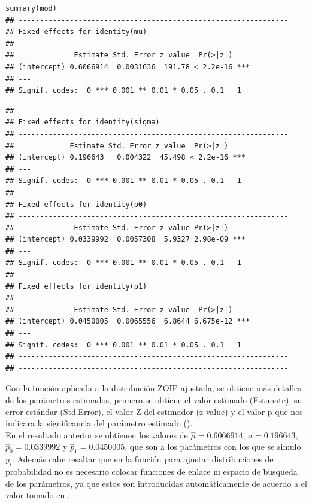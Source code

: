 \begin{verbatim}
summary(mod)
## ---------------------------------------------------------------
## Fixed effects for identity(mu)
## ---------------------------------------------------------------
##              Estimate Std. Error z value  Pr(>|z|)    
## (intercept) 0.6066914  0.0031636  191.78 < 2.2e-16 ***
## ---
## Signif. codes:  0 *** 0.001 ** 0.01 * 0.05 . 0.1   1
\end{verbatim}
\begin{verbatim}
## ---------------------------------------------------------------
## Fixed effects for identity(sigma)
## ---------------------------------------------------------------
##             Estimate Std. Error z value  Pr(>|z|)    
## (intercept) 0.196643   0.004322  45.498 < 2.2e-16 ***
## ---
## Signif. codes:  0 *** 0.001 ** 0.01 * 0.05 . 0.1   1
## ---------------------------------------------------------------
## Fixed effects for identity(p0)
## ---------------------------------------------------------------
##              Estimate Std. Error z value Pr(>|z|)    
## (intercept) 0.0339992  0.0057308  5.9327 2.98e-09 ***
## ---
## Signif. codes:  0 *** 0.001 ** 0.01 * 0.05 . 0.1   1
## ---------------------------------------------------------------
## Fixed effects for identity(p1)
## ---------------------------------------------------------------
##              Estimate Std. Error z value  Pr(>|z|)    
## (intercept) 0.0450005  0.0065556  6.8644 6.675e-12 ***
## ---
## Signif. codes:  0 *** 0.001 ** 0.01 * 0.05 . 0.1   1
## ---------------------------------------------------------------
## ---------------------------------------------------------------
\end{verbatim}
Con la funci\'{o}n  aplicada a la distribuci\'{o}n ZOIP ajustada, se obtiene m\'{a}s detalles de los par\'{a}metros estimados, primero se obtiene el valor estimado (Estimate), su error est\'{a}ndar (Std.Error), el valor Z del estimador (z value) y el valor p que nos indicara la significancia del par\'{a}metro estimado ().\\

En el resultado anterior se obtienen los valores de $\hat{\mu}=0.6066914$, $\hat{\sigma}=0.196643$, $\hat{p}_0=0.0339992$ y $\hat{p}_1=0.0450005$, que son a los par\'{a}metros con los que se simulo $y_i$. Adem\'{a}s cabe resaltar que en la funci\'{o}n  para ajustar distribuciones de probabilidad no es necesario colocar funciones de enlace ni espacio de busqueda de los par\'{a}metros, ya que estos son introducidas autom\'{a}ticamente de acuerdo a el valor tomado en .\\

